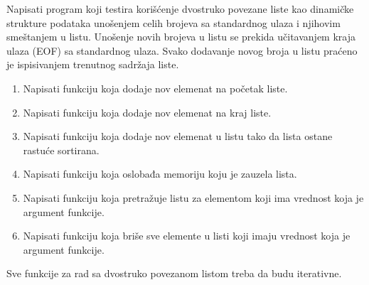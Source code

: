 \begin{Exercise}[label=603]
Napisati program koji testira korišćenje dvostruko povezane liste kao 
dinamičke strukture podataka unošenjem celih brojeva sa standardnog ulaza i 
njihovim smeštanjem u listu. 
Unošenje novih brojeva u listu se prekida učitavanjem kraja ulaza (EOF) sa 
standardnog ulaza. Svako dodavanje novog broja u listu praćeno je ispisivanjem 
trenutnog sadržaja liste. 
\begin{enumerate}
 \item Napisati funkciju koja dodaje nov elemenat na početak liste.
 \item Napisati funkciju koja dodaje nov elemenat na kraj liste.
 \item Napisati funkciju koja dodaje nov elemenat u listu tako da lista ostane rastuće sortirana.
 \item Napisati funkciju koja oslobađa memoriju koju je zauzela lista.
 \item Napisati funkciju koja pretražuje listu za elementom koji ima vrednost koja je argument funkcije.
 \item Napisati funkciju koja briše sve elemente u listi koji imaju vrednost koja je argument funkcije.
\end{enumerate}
Sve funkcije za rad sa dvostruko povezanom listom treba da budu iterativne.
\end{Exercise}
\begin{Answer}[ref=603]
\end{Answer}



